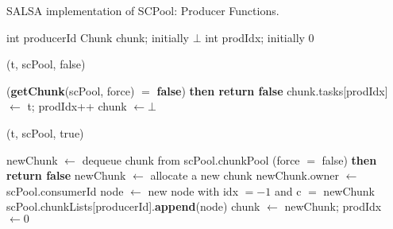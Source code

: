 \negspace
\begin{algo}[!ht]
\caption{SALSA implementation of SCPool: Producer Functions.}
\label{alg:producer-non-fifo}
\scriptsize
\begin{minipage}[t]{0.48\textwidth}
\begin{distribalgo}[1]
\setcounter{ALC@line}{\value{alg:non-fifo:lines}}

	\STATE int producerId
	\STATE Chunk chunk; initially $\bot$  \label{alg:line:chunk}
	\STATE int prodIdx; initially $0$ 
\ENDINDENT

\medskip

	(t, scPool, false)
\ENDINDENT

\medskip

		 ({\bf getChunk}(scPool, force) $=$ {\bf false}) {\bf then return false}
	\ENDINDENT
	\STATE chunk.tasks[prodIdx] $\leftarrow$ t; prodIdx++ \label{alg:line:chunk-insert}
	  \STATE chunk $\leftarrow \bot$ 
	\ENDINDENT
\ENDINDENT

\setcounter{alg:non-fifo:lines}{\value{ALC@line}} %
\end{distribalgo}
\end{minipage}%
%
\hfill
%
\begin{minipage}[t]{0.48\textwidth}
%
\begin{distribalgo}[1]
\setcounter{ALC@line}{\value{alg:non-fifo:lines}}

	(t, scPool, true)
\ENDINDENT

\medskip

	\STATE newChunk $\leftarrow$ dequeue chunk from scPool.chunkPool
	 \label{alg:line:no-chunk-start}
		  (force $=$ false) {\bf then return false} 
		 \STATE newChunk $\leftarrow$ allocate a new chunk \label{alg:line:no-chunk-end}
	\ENDINDENT
	\STATE newChunk.owner $\leftarrow$ scPool.consumerId
	\STATE node $\leftarrow$ new node with idx $=-1$ and c $=$ newChunk
	\STATE scPool.chunkLists[producerId].{\bf append}(node)
	\STATE chunk $\leftarrow$ newChunk; prodIdx $\leftarrow 0$ 
\ENDINDENT

\setcounter{alg:non-fifo:lines}{\value{ALC@line}}
\end{distribalgo}
\end{minipage}
\end{algo}
